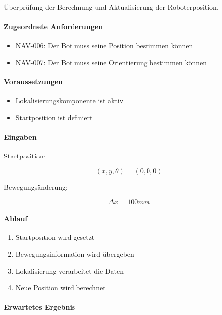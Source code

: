 \documentclass[
  a4paper,
  12pt,
  DIV=12,        %
  parskip=half,  %
  headings=small %
]{scrartcl}
\theoremstyle{definition}
\providecommand{\tightlist}{%
  \setlength{\itemsep}{0pt}\setlength{\parskip}{0pt}}
\theoremstyle{definition}
\begin{document}
Überprüfung der Berechnung und Aktualisierung der Roboterposition.

\paragraph{Zugeordnete Anforderungen}\label{zugeordnete-anforderungen-1}

\begin{itemize}
\tightlist
\item
  NAV-006: Der Bot muss seine Position bestimmen können
\item
  NAV-007: Der Bot muss seine Orientierung bestimmen können
\end{itemize}

\paragraph{Voraussetzungen}\label{voraussetzungen-1}

\begin{itemize}
\tightlist
\item
  Lokalisierungskomponente ist aktiv
\item
  Startposition ist definiert
\end{itemize}

\paragraph{Eingaben}\label{eingaben-1}

Startposition:

\[
(x,y,\theta)=(0,0,0)
\]

Bewegungsänderung:

\[
\Delta x=100mm
\]

\paragraph{Ablauf}\label{ablauf-1}

\begin{enumerate}
\def\labelenumi{\arabic{enumi}.}
\tightlist
\item
  Startposition wird gesetzt
\item
  Bewegungsinformation wird übergeben
\item
  Lokalisierung verarbeitet die Daten
\item
  Neue Position wird berechnet
\end{enumerate}

\paragraph{Erwartetes Ergebnis}\label{erwartetes-ergebnis-1}
\end{document}
